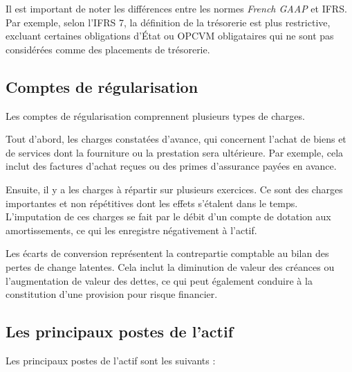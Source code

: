\documentclass[a4paper, 12pt]{report}
\begin{document}
Il est important de noter les différences entre les normes \textit{French GAAP} et IFRS. Par exemple, selon l'IFRS 7, la définition de la trésorerie est plus restrictive, excluant certaines obligations d'État ou OPCVM obligataires qui ne sont pas considérées comme des placements de trésorerie.

\subsection{Comptes de régularisation}

Les comptes de régularisation comprennent plusieurs types de charges. 

Tout d'abord, les charges constatées d'avance, qui concernent l'achat de biens et de services dont la fourniture ou la prestation sera ultérieure. Par exemple, cela inclut des factures d'achat reçues ou des primes d'assurance payées en avance.

Ensuite, il y a les charges à répartir sur plusieurs exercices. Ce sont des charges importantes et non répétitives dont les effets s'étalent dans le temps. L'imputation de ces charges se fait par le débit d'un compte de dotation aux amortissements, ce qui les enregistre négativement à l'actif.

Les écarts de conversion représentent la contrepartie comptable au bilan des pertes de change latentes. Cela inclut la diminution de valeur des créances ou l'augmentation de valeur des dettes, ce qui peut également conduire à la constitution d'une provision pour risque financier.


\subsection{Les principaux postes de l'actif}

Les principaux postes de l'actif sont les suivants :
\end{document}
